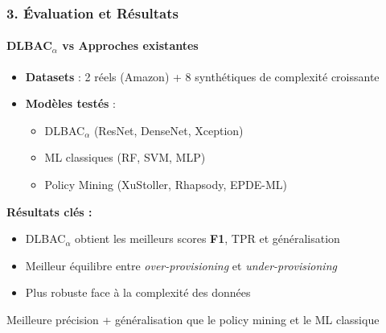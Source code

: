 \documentclass{beamer}
\begin{document}
\begin{frame}
\frametitle{3. Évaluation et Résultats}
\framesubtitle{DLBAC$_\alpha$ vs Approches existantes}

\begin{itemize}
    \item \textbf{Datasets} : 2 réels (Amazon) + 8 synthétiques de complexité croissante
    \item \textbf{Modèles testés} :
    \begin{itemize}
        \item DLBAC$_\alpha$ (ResNet, DenseNet, Xception)
        \item ML classiques (RF, SVM, MLP)
        \item Policy Mining (XuStoller, Rhapsody, EPDE-ML)
    \end{itemize}
\end{itemize}

\textbf{Résultats clés :}
\begin{itemize}
    \item DLBAC$_\alpha$ obtient les meilleurs scores \textbf{F1}, TPR et généralisation
    \item Meilleur équilibre entre \textit{over-provisioning} et \textit{under-provisioning}
    \item Plus robuste face à la complexité des données
\end{itemize}

\begin{center}
\small Meilleure précision + généralisation que le policy mining et le ML classique
\end{center}

\end{frame}
\end{document}
